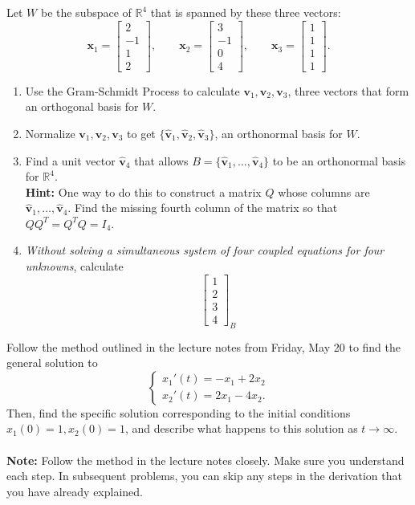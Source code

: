 \documentclass[12pt,letterpaper]{hmcpset}
\newcommand{\RR}{\mathbb{R}}
\newcommand{\m}[1]{\begin{bmatrix} #1 \end{bmatrix}}
\newcommand{\hatbf}[1]{\hat{\mathbf{#1}}}
\begin{document}
\begin{problem}[2]
    Let $W$ be the subspace of $\RR^4$ that is spanned by these three
    vectors:
    \[
        \mathbf{x}_1=\m{2\\-1\\1\\2},\qquad\mathbf{x}_2=\m{3\\-1\\0\\4},\qquad
        \mathbf{x}_3=\m{1\\1\\1\\1}.
    \]
    \begin{enumerate}
        \item Use the Gram-Schmidt Process to calculate $\mathbf{v}_1,
            \mathbf{v}_2,\mathbf{v}_3$, three vectors that form an
            orthogonal basis for $W$.
        \item Normalize $\mathbf{v}_1,\mathbf{v}_2,\mathbf{v}_3$ to
            get $\{\hatbf{v}_1,\hatbf{v}_2,\hatbf{v}_3\}$, an
            orthonormal basis for $W$.
        \item Find a unit vector $\hatbf{v}_4$ that allows
            $B=\{\hatbf{v}_1,\dots,\hatbf{v}_4\}$ to be an orthonormal
            basis for $\RR^4$.\\
            \textbf{Hint:} One way to do this to construct a matrix
            $Q$ whose columns are
            $\hatbf{v}_1,\dots,\hatbf{v}_4$. Find the missing fourth
            column of the matrix so that $QQ^T=Q^TQ=I_4$.
        \item \textit{Without solving a simultaneous system of four
            coupled equations for four unknowns}, calculate
            \[
                \m{1\\2\\3\\4}_B
            \]
    \end{enumerate}
\end{problem}
\begin{solution}
    \vfill
\end{solution}
\newpage

\begin{problem}[3]
    Follow the method outlined in the lecture notes from Friday, May
    20 to find the general solution to
    \[
        \begin{cases}
            x_1'(t)=-x_1+2x_2\\
            x_2'(t)=2x_1-4x_2.
        \end{cases}
    \]
    Then, find the specific solution corresponding to the initial
    conditions $x_1(0)=1,x_2(0)=1$, and describe what happens to
    this solution as $t\to\infty$.\\\\
    \textbf{Note:} Follow the method in the lecture notes
    closely. Make sure you understand each step. In subsequent
    problems, you can skip any steps in the derivation that you have
    already explained.
\end{problem}
\begin{solution}
    \vfill
\end{solution}
\newpage
\end{document}
